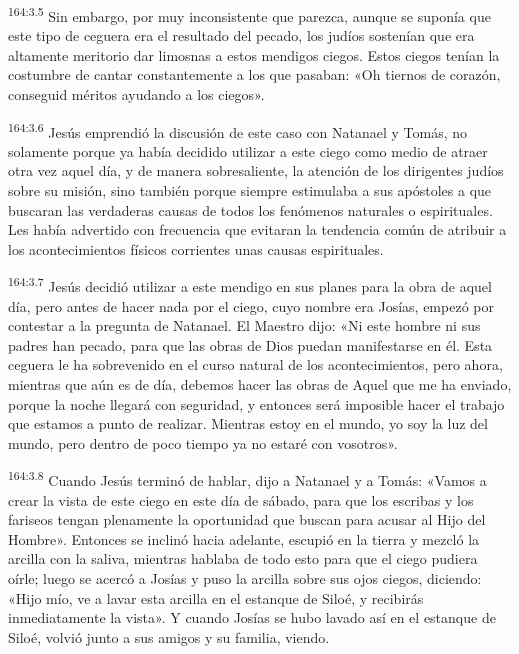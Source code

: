 \par 
\textsuperscript{164:3.5} Sin embargo, por muy inconsistente que parezca, aunque se suponía que este tipo de ceguera era el resultado del pecado, los judíos sostenían que era altamente meritorio dar limosnas a estos mendigos ciegos. Estos ciegos tenían la costumbre de cantar constantemente a los que pasaban: «Oh tiernos de corazón, conseguid méritos ayudando a los ciegos».

\par 
\textsuperscript{164:3.6} Jesús emprendió la discusión de este caso con Natanael y Tomás, no solamente porque ya había decidido utilizar a este ciego como medio de atraer otra vez aquel día, y de manera sobresaliente, la atención de los dirigentes judíos sobre su misión, sino también porque siempre estimulaba a sus apóstoles a que buscaran las verdaderas causas de todos los fenómenos naturales o espirituales. Les había advertido con frecuencia que evitaran la tendencia común de atribuir a los acontecimientos físicos corrientes unas causas espirituales.

\par 
\textsuperscript{164:3.7} Jesús decidió utilizar a este mendigo en sus planes para la obra de aquel día, pero antes de hacer nada por el ciego, cuyo nombre era Josías, empezó por contestar a la pregunta de Natanael. El Maestro dijo: «Ni este hombre ni sus padres han pecado, para que las obras de Dios puedan manifestarse en él. Esta ceguera le ha sobrevenido en el curso natural de los acontecimientos, pero ahora, mientras que aún es de día, debemos hacer las obras de Aquel que me ha enviado, porque la noche llegará con seguridad, y entonces será imposible hacer el trabajo que estamos a punto de realizar. Mientras estoy en el mundo, yo soy la luz del mundo, pero dentro de poco tiempo ya no estaré con vosotros».

\par 
\textsuperscript{164:3.8} Cuando Jesús terminó de hablar, dijo a Natanael y a Tomás: «Vamos a crear la vista de este ciego en este día de sábado, para que los escribas y los fariseos tengan plenamente la oportunidad que buscan para acusar al Hijo del Hombre». Entonces se inclinó hacia adelante, escupió en la tierra y mezcló la arcilla con la saliva, mientras hablaba de todo esto para que el ciego pudiera oírle; luego se acercó a Josías y puso la arcilla sobre sus ojos ciegos, diciendo: «Hijo mío, ve a lavar esta arcilla en el estanque de Siloé, y recibirás inmediatamente la vista». Y cuando Josías se hubo lavado así en el estanque de Siloé, volvió junto a sus amigos y su familia, viendo.

